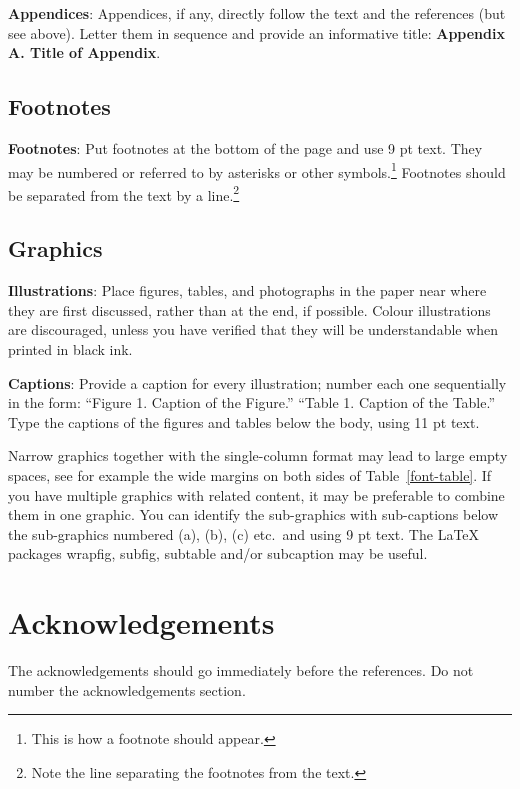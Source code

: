 \documentclass[11pt]{article}
\begin{document}
{\bf Appendices}: Appendices, if any, directly follow the text and the
references (but see above).  Letter them in sequence and provide an
informative title: {\bf Appendix A. Title of Appendix}.

\subsection{Footnotes}

{\bf Footnotes}: Put footnotes at the bottom of the page and use 9 pt
text. They may be numbered or referred to by asterisks or other
symbols.\footnote{This is how a footnote should appear.} Footnotes
should be separated from the text by a line.\footnote{Note the line
separating the footnotes from the text.}

\subsection{Graphics}

{\bf Illustrations}: Place figures, tables, and photographs in the
paper near where they are first discussed, rather than at the end, if
possible. 
Colour illustrations are discouraged, unless you have verified that  
they will be understandable when printed in black ink.

{\bf Captions}: Provide a caption for every illustration; number each one
sequentially in the form:  ``Figure 1. Caption of the Figure.'' ``Table 1.
Caption of the Table.''  Type the captions of the figures and 
tables below the body, using 11 pt text.

Narrow graphics together with the single-column format may lead to
large empty spaces,
see for example the wide margins on both sides of Table~\ref{font-table}.
If you have multiple graphics with related content, it may be
preferable to combine them in one graphic.
You can identify the sub-graphics with sub-captions below the
sub-graphics numbered (a), (b), (c) etc.\ and using 9 pt text.
The \LaTeX{} packages wrapfig, subfig, subtable and/or subcaption
may be useful.

\section*{Acknowledgements}

The acknowledgements should go immediately before the references.  Do
not number the acknowledgements section.



\end{document}
